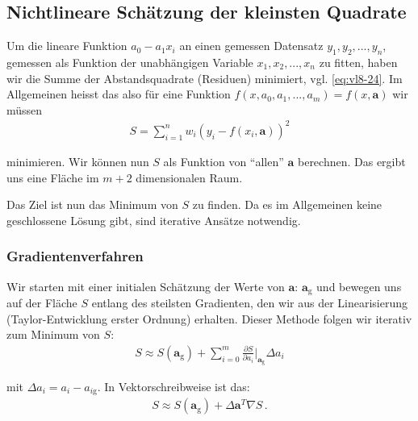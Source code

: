\subsection{Nichtlineare Sch\"atzung der kleinsten Quadrate}
\label{subsec:vl9}

Um die lineare Funktion $a_0 - a_1 x_i$ an einen gemessen Datensatz $y_1, y_2, ..., y_n$, gemessen als Funktion der unabh\"angigen Variable $x_1, x_2, ..., x_n$ zu fitten, haben wir die Summe der Abstandsquadrate (Residuen) minimiert, vgl. \cref{eq:vl8-24}. Im Allgemeinen heisst das also f\"ur eine Funktion $f(x, a_0, a_1, ..., a_m) = f(x, \boldsymbol{a})$ wir m\"ussen
\begin{align}
S = \sum_{i=1}^n w_i (y_i - f(x_i, \boldsymbol{a}) )^2
\label{eq:vl9-1}
\end{align}

minimieren. Wir k\"onnen nun $S$ als Funktion von ``allen'' $\boldsymbol{a}$ berechnen. Das ergibt uns eine Fl\"ache im $m + 2$ dimensionalen Raum.


\begin{center}
\begin{tcolorbox}[enhanced,width=6in,drop fuzzy shadow southwest,
    colframe=red!50!black,colback=red!05]
   Das Ziel ist nun das Minimum von $S$ zu finden. Da es im Allgemeinen keine geschlossene L\"osung gibt, sind iterative Ans\"atze notwendig.
\end{tcolorbox}
\end{center}


\subsubsection{Gradientenverfahren}
\label{subsubsec:vl9-1}

Wir starten mit einer initialen Sch\"atzung der Werte von $\boldsymbol{a}$: $\boldsymbol{a}_\mathrm{g}$ und bewegen uns auf der Fl\"ache $S$ entlang des steilsten Gradienten, den wir aus der Linearisierung (Taylor-Entwicklung erster Ordnung) erhalten. Dieser Methode folgen wir iterativ zum Minimum von $S$:
\begin{align}
S \approx S(\boldsymbol{a}_\mathrm{g}) + \sum_{i=0}^m \frac{ \partial S }{ \partial a_i } \bigg|_{\boldsymbol{a}_\mathrm{g}} \Delta a_i
\label{eq:vl9-2}
\end{align}

mit $\Delta a_i = a_i - a_{i\mathrm{g}}$. In Vektorschreibweise ist das:
\begin{align}
S \approx S(\boldsymbol{a}_\mathrm{g}) + \Delta \boldsymbol{a}^T \nabla S\,.
\label{eq:vl9-3}
\end{align}

